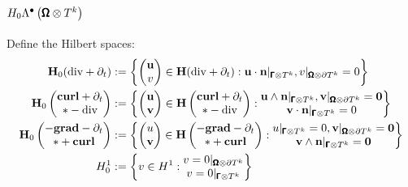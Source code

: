         \subsection*{$H_{0}\Lambda^{\bullet}\left(\pmb{\mathsf{\Omega}}\otimes T^{k}\right)$}
            Define the Hilbert spaces:
            \begin{align}
                \mathbf{H}_{0}(\mathrm{div} + \partial_{t})  &:=  \left\{\begin{pmatrix} \mathbf{u} \\ v \end{pmatrix} \in \mathbf{H}(\mathrm{div} + \partial_{t}) : \mathbf{u}\cdot\mathbf{n}|_{\pmb{\mathsf{\Gamma}}\otimes T^{k}}, v|_{\pmb{\mathsf{\Omega}}\otimes\partial T^{k}} = 0\right\}  \\
                \mathbf{H}_{0}\left(\begin{matrix} \mathbf{curl} + \partial_{t} \\ * - \mathrm{div} \end{matrix}\right)  &:=  \left\{\begin{pmatrix} \mathbf{u} \\ \mathbf{v} \end{pmatrix} \in \mathbf{H}\left(\begin{matrix} \mathbf{curl} + \partial_{t} \\ * - \mathrm{div} \end{matrix}\right) : \begin{matrix} \mathbf{u}\wedge\mathbf{n}|_{\pmb{\mathsf{\Gamma}}\otimes T^{k}}, \mathbf{v}|_{\pmb{\mathsf{\Omega}}\otimes\partial T^{k}} = \mathbf{0} \\ \mathbf{v}\cdot\mathbf{n}|_{\pmb{\mathsf{\Gamma}}\otimes T^{k}} = 0 \end{matrix}\right\}  \\
                \mathbf{H}_{0}\left(\begin{matrix} - \mathbf{grad} - \partial_{t} \\ * + \mathbf{curl} \end{matrix}\right)  &:=  \left\{\begin{pmatrix} u \\ \mathbf{v} \end{pmatrix} \in \mathbf{H}\left(\begin{matrix} - \mathbf{grad} - \partial_{t} \\ * + \mathbf{curl} \end{matrix}\right) : \begin{matrix} u|_{\pmb{\mathsf{\Gamma}}\otimes T^{k}} = 0, \mathbf{v}|_{\pmb{\mathsf{\Omega}}\otimes\partial T^{k}} = \mathbf{0} \\ \mathbf{v}\wedge\mathbf{n}|_{\pmb{\mathsf{\Gamma}}\otimes T^{k}} = \mathbf{0} \end{matrix}\right\}  \\
                H^{1}_{0}  &:=  \left\{v \in H^{1} : \begin{matrix} v = 0|_{\pmb{\mathsf{\Omega}}\otimes\partial T^{k}} \\ v = 0|_{\pmb{\mathsf{\Gamma}}\otimes T^{k}} \end{matrix}\right\}
            \end{align}
